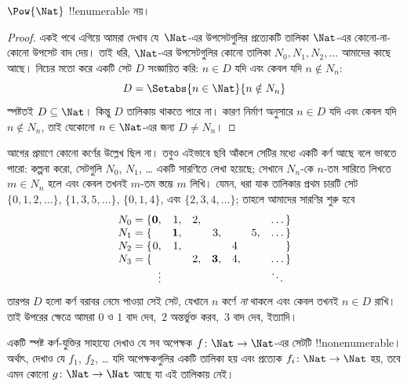 \documentclass[../../../include/open-logic-section]{subfiles}
\begin{document}
\begin{thm}
$\Pow{\Nat}$ !!{enumerable} নয়।
\end{thm}

\begin{proof}
একই পথে এগিয়ে আমরা দেখাব যে~$\Nat$-এর উপসেটগুলির প্রত্যেকটি তালিকা $\Nat$-এর কোনো-না-কোনো উপসেট বাদ দেয়। তাই ধরি, $\Nat$-এর উপসেটগুলির কোনো তালিকা $N_0, N_1, N_2, \ldots$ আমাদের কাছে আছে। নিচের মতো করে একটি সেট $D$ সংজ্ঞায়িত করি: $n \in D$ যদি এবং কেবল যদি $n \notin N_{n}$:
\[
D = \Setabs{n \in \Nat}{n \notin N_n}
\]
স্পষ্টতই $D\subseteq \Nat$। কিন্তু $D$ তালিকায় থাকতে পারে না। কারণ নির্মাণ অনুসারে $n \in D$ যদি এবং কেবল যদি $n\notin N_n$, তাই যেকোনো $n \in \Nat$-এর জন্য $D \neq N_n$।
\end{proof}

\begin{explain}
আগের প্রমাণে কোনো কর্ণের উল্লেখ ছিল না। তবুও এইভাবে ছবি আঁকলে সেটির মধ্যে একটি কর্ণ আছে বলে ভাবতে পারো: কল্পনা করো, সেটগুলি $N_0$, $N_1$, \dots{} একটি সারণিতে লেখা হয়েছে; সেখানে $N_n$-কে $n$-তম সারিতে লিখতে $m \in N_n$ হলে এবং কেবল তখনই $m$-তম স্তম্ভে $m$ লিখি। যেমন, ধরা যাক তালিকার প্রথম চারটি সেট
$\{0,1,2,\dots\}$, $\{1, 3, 5, \dots\}$, $\{0,1,4\}$, এবং
$\{2,3,4,\dots\}$; তাহলে আমাদের সারণির শুরু হবে
\[
\begin{array}{r@{}rrrrrrr}
  N_0 = \{ & \mathbf{0}, & 1, & 2, & & & & \dots\}\\
  N_1 = \{ &  & \mathbf{1}, &  & 3, &  & 5, & \dots\}\\
  N_2 = \{ & 0, & 1, &  &  & 4\phantom{,} &  & \}\\
  N_3 = \{ &  &  & 2, & \mathbf{3}, & 4, & & \dots\}\\
  &\vdots & & & & & & \ddots\phantom{\}}
  \end{array}
\]
তারপর $D$ হলো কর্ণ বরাবর নেমে পাওয়া সেই সেট, যেখানে $n$ কর্ণে \emph{না} থাকলে এবং কেবল তখনই $n
\in D$ রাখি। তাই উপরের ক্ষেত্রে আমরা $0$ ও $1$ বাদ দেব,~$2$ অন্তর্ভুক্ত করব,~$3$ বাদ দেব, ইত্যাদি।
\end{explain}

\begin{prob}
একটি স্পষ্ট কর্ণ-যুক্তির সাহায্যে দেখাও যে সব অপেক্ষক $f \colon \Nat \to \Nat$-এর সেটটি
!!{nonenumerable}। অর্থাৎ, দেখাও যে $f_1$, $f_2$, \dots{} যদি অপেক্ষকগুলির একটি তালিকা হয় এবং প্রত্যেক $f_i\colon
\Nat \to \Nat$ হয়, তবে এমন কোনো $g \colon \Nat \to
\Nat$ আছে যা এই তালিকায় নেই।
\end{prob}
\end{document}
